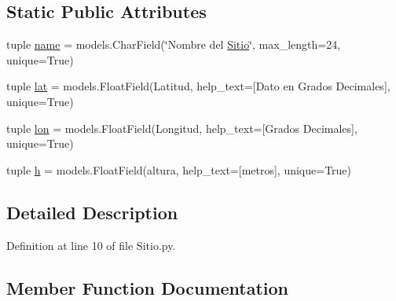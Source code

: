 \subsection*{Static Public Attributes}
\begin{DoxyCompactItemize}
\item 
tuple \hyperlink{class_ground_segment_1_1models_1_1_sitio_1_1_sitio_ad9bfe4bfea9a9a600a9cf0a17dfe2abf}{name} = models.\+Char\+Field(\char`\"{}Nombre del \hyperlink{class_ground_segment_1_1models_1_1_sitio_1_1_sitio}{Sitio}\char`\"{}, max\+\_\+length=24, unique=True)
\item 
tuple \hyperlink{class_ground_segment_1_1models_1_1_sitio_1_1_sitio_a981bccda8fdc7772f7ce19d23e3c6bd7}{lat} = models.\+Float\+Field(\textquotesingle{}Latitud\textquotesingle{}, help\+\_\+text=\textquotesingle{}\mbox{[}Dato en Grados Decimales\mbox{]}\textquotesingle{}, unique=True)
\item 
tuple \hyperlink{class_ground_segment_1_1models_1_1_sitio_1_1_sitio_a58939f0d8d5fff5d4807f745c6ba3335}{lon} = models.\+Float\+Field(\textquotesingle{}Longitud\textquotesingle{}, help\+\_\+text=\textquotesingle{}\mbox{[}Grados Decimales\mbox{]}\textquotesingle{}, unique=True)
\item 
tuple \hyperlink{class_ground_segment_1_1models_1_1_sitio_1_1_sitio_a0345de18d6f8cc930f291c639a915366}{h} = models.\+Float\+Field(\textquotesingle{}altura\textquotesingle{}, help\+\_\+text=\textquotesingle{}\mbox{[}metros\mbox{]}\textquotesingle{}, unique=True)
\end{DoxyCompactItemize}


\subsection{Detailed Description}


Definition at line 10 of file Sitio.\+py.



\subsection{Member Function Documentation}
\hypertarget{class_ground_segment_1_1models_1_1_sitio_1_1_sitio_a76b0e7facd2de38df048e845ebd100ae}{}
